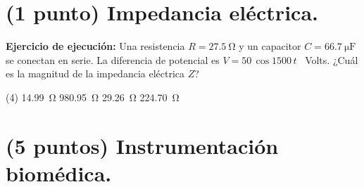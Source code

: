 \documentclass[12pt, letter]{exam}
\begin{document}
\begin{questions}
    \section{(1 punto) Impedancia eléctrica.}

    \question \label{Ejercicio_13} \textbf{Ejercicio de ejecución: } Una resistencia $R = \SI{27.5}{\ohm}$ y un capacitor $C = \SI{66.7}{\micro\farad}$ se conectan en serie. La diferencia de potencial es $V = \num{50} \, \cos 1500 \, t$ \, Volts. ¿Cuál es la magnitud de la impedancia eléctrica $Z$?
    \begin{tasks}(4)
        \task \SI{14.99}{\ohm}
        \task \SI{980.95}{\ohm}
        \task \SI{29.26}{\ohm}
        \task \SI{224.70}{\ohm}
    \end{tasks}

    \section{(5 puntos) Instrumentación biomédica.}


\end{questions}
\end{document}
